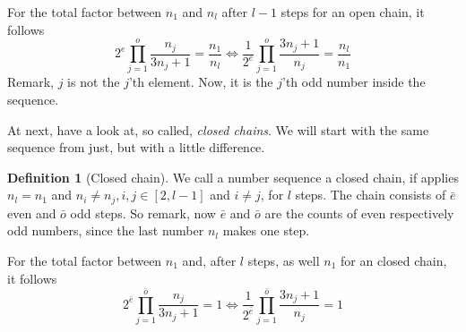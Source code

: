 \documentclass{aomart}
\theoremstyle{definition}
\newtheorem{defn}{Definition}[section]
\begin{document}
For the total factor between $n_{1}$ and $n_{l}$ after $l-1$ steps for an open chain, it follows
\begin{equation}\label{eq:proop}
	2^{e} \prod_{j=1}^{o} \frac{n_{j}}{3n_{j}+1} = \frac{n_{1}}{n_{l}} \Leftrightarrow \frac{1}{2^{e}} \prod_{j=1}^{o} \frac{3n_{j}+1}{n_{j}} = \frac{n_{l}}{n_{1}} 
\end{equation}
Remark, $j$ is not the $j$'th element. Now, it is the $j$'th odd number inside the sequence.

At next, have a look at, so called, \textit{closed chains}. We will start with the same sequence from just, but with a little difference.

\begin{defn}[Closed chain] We call a number sequence a closed chain, if applies $n_{l} = n_{1}$ and $n_{i} \neq n_{j}, i,j \in [2,l-1]$ and $i \neq j$, for $l$ steps. The chain consists of $\bar{e}$ even and $\bar{o}$ odd steps. So remark, now $\bar{e}$ and $\bar{o}$ are the counts of even respectively odd numbers, since the last number $n_{l}$ makes one step.
\end{defn}

For the total factor between $n_{1}$ and, after $l$ steps, as well $n_{1}$ for an closed chain, it follows
\begin{equation}\label{eq:procl}
	2^{\bar{e}} \prod_{j=1}^{\bar{o}} \frac{n_{j}}{3n_{j}+1} = 1 \Leftrightarrow \frac{1}{2^{\bar{e}}} \prod_{j=1}^{\bar{o}} \frac{3n_{j}+1}{n_{j}} = 1
\end{equation}
\end{document}
